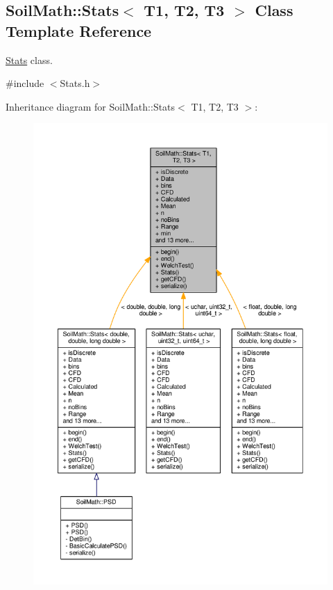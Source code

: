\hypertarget{class_soil_math_1_1_stats}{}\subsection{Soil\+Math\+:\+:Stats$<$ T1, T2, T3 $>$ Class Template Reference}
\label{class_soil_math_1_1_stats}


\hyperlink{class_soil_math_1_1_stats}{Stats} class.  




{\ttfamily \#include $<$Stats.\+h$>$}



Inheritance diagram for Soil\+Math\+:\+:Stats$<$ T1, T2, T3 $>$\+:
\nopagebreak
\begin{figure}[H]
\begin{center}
\leavevmode
\includegraphics[width=350pt]{class_soil_math_1_1_stats__inherit__graph}
\end{center}
\end{figure}



